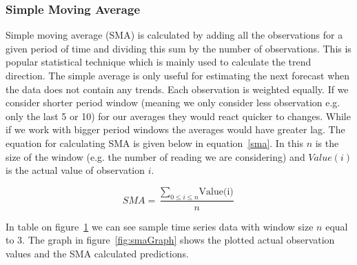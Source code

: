 \subsubsection{Simple Moving Average}
Simple moving average (SMA) is calculated by adding all the observations for a given period of time and dividing this sum by the number of observations. This is popular statistical technique which is mainly used to calculate the trend direction. The simple average is only useful for estimating the next forecast when the data does not contain any trends. Each observation is weighted equally. If we consider shorter period window (meaning we only consider less observation e.g. only the last 5 or 10) for our averages they would react quicker to changes. While if we work with bigger period windows the averages would have greater lag. The equation for calculating SMA is given below in equation~\ref{sma}. In this $n$ is the size of the window (e.g. the number of reading we are considering) and $Value(i)$ is the actual value of observation $i$. 

\begin{equation}\label{sma}
	SMA = \frac{\sum_{0\le i\le n}\textrm{Value(i)}}{n}
\end{equation}

In table on figure~\ref{fig:smaTable} we can see sample time series data with window size $n$ equal to $3$. The graph in figure~\ref{fig:smaGraph} shows the plotted actual observation values and the SMA calculated predictions.

\begin{figure}[ht]
	\caption{}
	\label{fig:smaTable}
\end{figure}


